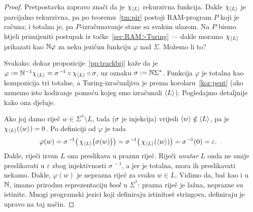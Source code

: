 \begin{proof}
Pretpostavka zapravo znači da je $\chi_{\langle L\rangle}$ rekurzivna funkcija. Dakle $\chi_{\langle L\rangle}$ je parcijalno rekurzivna, pa po teoremu~\ref{tm:pir} postoji RAM-program $P$ koji je računa; i totalna je, pa $P$-izračunavanje stane sa svakim ulazom. Na $P$ bismo htjeli primijeniti postupak iz točke~\ref{sec:RAM>Turing} --- dakle moramo $\chi_{\langle L\rangle}$ prikazati kao ${\mathbb N}\varphi$ za neku jezičnu funkciju $\varphi$ nad $\Sigma$. Možemo li to?

Svakako: dokaz propozicije~\ref{pp:trackbij} kaže da je $\varphi:={\mathbb N}^{-1}\chi_{\langle L\rangle}=\sigma^{\,-\!1}\circ\chi_{\langle L\rangle}\circ\sigma$, uz oznaku $\sigma:={\mathbb N}\Sigma^*$. Funkcija $\varphi$ je totalna kao kompozicija tri totalne, a Turing-izračunljiva je prema korolaru~\ref{kor:pent} (ako uzmemo isto kodiranje pomoću kojeg smo izračunali $\langle L\rangle$). Pogledajmo detaljnije kako ona djeluje.

Ako joj damo riječ $w\in\Sigma^*\setminus L$, tada ($\mspace{-1mu}\sigma$ je injekcija) vrijedi $\langle w\rangle\notin\langle L\rangle$, pa je $\chi_{\langle L\rangle}(\langle w\rangle)=0$. Po definiciji od $\varphi$ je tada
\begin{equation}
    \varphi(w)=\sigma^{\,-\!1}\bigl(\,\chi_{\langle L\rangle}\bigl(\sigma(w)\bigr)\bigr)=\sigma^{\,-\!1}\bigl(\,\chi_{\langle L\rangle}(\langle w\rangle)\bigr)=\sigma^{\,-\!1}(0)=\varepsilon\text.
\end{equation}
Dakle, riječi izvan $L$ ona preslikava u praznu riječ. Riječi \emph{unutar} $L$ onda ne smije preslikavati u $\varepsilon$ zbog injektivnosti $\sigma^{\,-\!1}$, a jer je totalna, mora ih preslikavati nekamo. Dakle, $\varphi(w)$ je neprazna riječ za svaku $w\in L$. Vidimo da, baš kao i u ${\mathbb N}$, imamo prirodnu reprezentaciju $bool$ u $\Sigma^*$: prazna riječ je lažna, neprazne su istinite. Mnogi programski jezici koji definiraju istinitost stringova, definiraju je upravo na taj način.



\end{proof}

